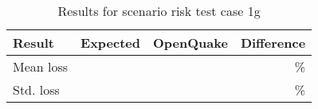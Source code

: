 \begin{table}[htbp]

\centering
\begin{tabular}{ l r r r }

\hline
\rowcolor{anti-flashwhite}
\bf{Result} & \bf{Expected} & \bf{OpenQuake} & \bf{Difference}\\
\hline
Mean loss &  &  & \% \\
Std. loss &  &  & \% \\
\hline
\end{tabular}

\caption{Results for scenario risk test case 1g}
\label{tab:result-sr-1g}
\end{table}
